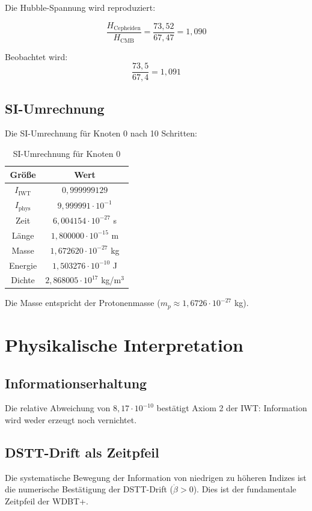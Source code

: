 \documentclass[12pt,a4paper]{article}
\begin{document}
Die Hubble-Spannung wird reproduziert:

\[
\frac{H_{\text{Cepheiden}}}{H_{\text{CMB}}} = \frac{73,52}{67,47} = 1,090
\]

Beobachtet wird:
\[
\frac{73,5}{67,4} = 1,091
\]

\subsection{SI-Umrechnung}

Die SI-Umrechnung für Knoten 0 nach 10 Schritten:

\begin{table}[H]
\centering
\begin{tabular}{c|c}
Größe & Wert \\
\hline
$I_{\text{IWT}}$ & $0,999999129$ \\
$I_{\text{phys}}$ & $9,999991 \cdot 10^{-1}$ \\
Zeit & $6,004154 \cdot 10^{-27}$ s \\
Länge & $1,800000 \cdot 10^{-15}$ m \\
Masse & $1,672620 \cdot 10^{-27}$ kg \\
Energie & $1,503276 \cdot 10^{-10}$ J \\
Dichte & $2,868005 \cdot 10^{17}$ kg/m$^3$ \\
\end{tabular}
\caption{SI-Umrechnung für Knoten 0}
\label{tab:si}
\end{table}

Die Masse entspricht der Protonenmasse ($m_p \approx 1,6726 \cdot 10^{-27}$ kg).

\section{Physikalische Interpretation}

\subsection{Informationserhaltung}

Die relative Abweichung von $8,17 \cdot 10^{-10}$ bestätigt Axiom 2 der IWT: Information wird weder erzeugt noch vernichtet.

\subsection{DSTT-Drift als Zeitpfeil}

Die systematische Bewegung der Information von niedrigen zu höheren Indizes ist die numerische Bestätigung der DSTT-Drift ($\dot{\beta} > 0$). Dies ist der fundamentale Zeitpfeil der WDBT+.
\end{document}
